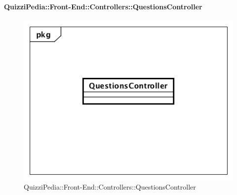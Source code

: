\paragraph{QuizziPedia::Front-End::Controllers::QuestionsController}
\begin{figure}
	\centering
	\includegraphics[scale=0.45]{UML/Classi/Front-End/QuizziPedia_Front-end_Controller_QuestionsController.png}
	\caption{QuizziPedia::Front-End::Controllers::QuestionsController}
\end{figure}
